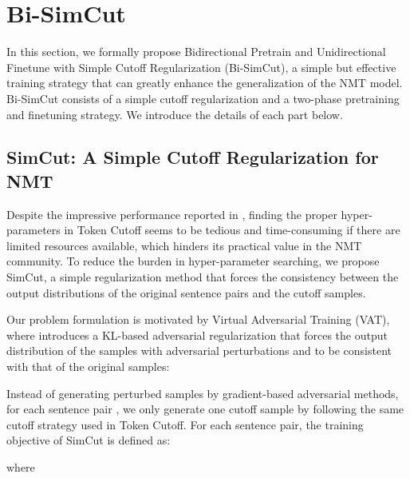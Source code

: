 \documentclass[11pt]{article}
\begin{document}
\section{Bi-SimCut}

In this section, we formally propose Bidirectional Pretrain and Unidirectional Finetune with Simple Cutoff Regularization (Bi-SimCut), a simple but effective training strategy that can greatly enhance the generalization of the NMT model. Bi-SimCut consists of a simple cutoff regularization and a two-phase pretraining and finetuning strategy. We introduce the details of each part below.

\subsection{SimCut: A Simple Cutoff Regularization for NMT}

Despite the impressive performance reported in \citet{shen2020simple}, finding the proper hyper-parameters  in Token Cutoff seems to be tedious and time-consuming if there are limited resources available, which hinders its practical value in the NMT community. To reduce the burden in hyper-parameter searching, we propose SimCut, a simple regularization method that forces the consistency between the output distributions of the original sentence pairs and the cutoff samples. 

Our problem formulation is motivated by Virtual Adversarial Training (VAT), where \citet{sano2019effective} introduces a KL-based adversarial regularization that forces the output distribution of the samples with adversarial perturbations  and  to be consistent with that of the original samples:

Instead of generating perturbed samples by gradient-based adversarial methods, for each sentence pair , we only generate one cutoff sample  by following the same cutoff strategy used in Token Cutoff. For each sentence pair, the training objective of SimCut is defined as:

where
\end{document}
